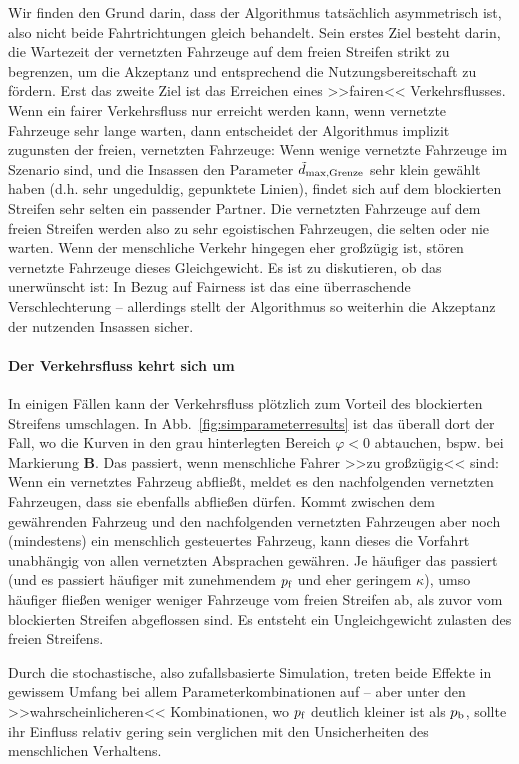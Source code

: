 Wir finden den Grund darin, dass der Algorithmus tatsächlich asymmetrisch ist, also nicht beide Fahrtrichtungen gleich behandelt. Sein erstes Ziel besteht darin, die Wartezeit der vernetzten Fahrzeuge auf dem freien Streifen strikt zu begrenzen, um die Akzeptanz und entsprechend die Nutzungsbereitschaft zu fördern. Erst das zweite Ziel ist das Erreichen eines >>fairen<< Verkehrsflusses. Wenn ein fairer Verkehrsfluss nur erreicht werden kann, wenn vernetzte Fahrzeuge sehr lange warten, dann entscheidet der Algorithmus implizit zugunsten der freien, vernetzten Fahrzeuge: Wenn wenige vernetzte Fahrzeuge im Szenario sind, und die Insassen den Parameter $\tilde{d}_{\text{max,Grenze}}$ sehr klein gewählt haben (d.h. sehr ungeduldig, gepunktete Linien), findet sich auf dem blockierten Streifen sehr selten ein passender Partner. Die vernetzten Fahrzeuge auf dem freien Streifen werden also zu sehr egoistischen Fahrzeugen, die selten oder nie warten. Wenn der menschliche Verkehr hingegen eher großzügig ist, stören vernetzte Fahrzeuge dieses Gleichgewicht. Es ist zu diskutieren, ob das unerwünscht ist: In Bezug auf Fairness ist das eine überraschende Verschlechterung -- allerdings stellt der Algorithmus so weiterhin die Akzeptanz der nutzenden Insassen sicher.



\paragraph{Der Verkehrsfluss kehrt sich um}\label{sec:effect-reversed-flow} In einigen Fällen kann der Verkehrsfluss plötzlich zum Vorteil des blockierten Streifens umschlagen. In Abb.~\ref{fig:simparameterresults} ist das überall dort der Fall, wo die Kurven in den grau hinterlegten Bereich $\varphi < 0$ abtauchen, bspw. bei Markierung \textbf{B}. Das passiert, wenn menschliche Fahrer >>zu großzügig<< sind: Wenn ein vernetztes Fahrzeug abfließt, meldet es den nachfolgenden vernetzten Fahrzeugen, dass sie ebenfalls abfließen dürfen. Kommt zwischen dem gewährenden Fahrzeug und den nachfolgenden vernetzten Fahrzeugen aber noch (mindestens) ein menschlich gesteuertes Fahrzeug, kann dieses die Vorfahrt unabhängig von allen vernetzten Absprachen gewähren. Je häufiger das passiert (und es passiert häufiger mit zunehmendem $p_{\text{f}}$ und eher geringem $\kappa$), umso häufiger fließen weniger weniger Fahrzeuge vom freien Streifen ab, als zuvor vom blockierten Streifen abgeflossen sind. Es entsteht ein Ungleichgewicht zulasten des freien Streifens.

Durch die stochastische, also zufallsbasierte Simulation, treten beide Effekte in gewissem Umfang bei allem Parameterkombinationen auf -- aber unter den >>wahrscheinlicheren<< Kombinationen, wo $p_{\text{f}}$ deutlich kleiner ist als $p_{\text{b}}$, sollte ihr Einfluss relativ gering sein verglichen mit den Unsicherheiten des menschlichen Verhaltens.



